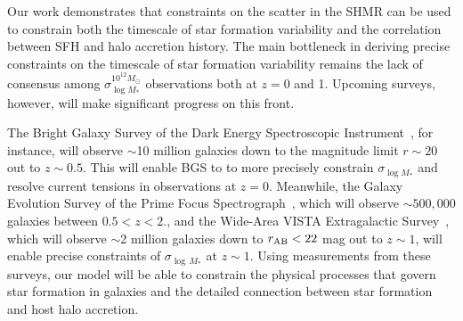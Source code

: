 \documentclass[12pt, letterpaper, preprint, tighten]{aastex62}
\newcommand{\siglogm}{\sigma_{\log M_*}}
\begin{document}
Our work demonstrates that constraints on the scatter in the SHMR can be
used to constrain both the timescale of star formation variability and
the correlation between SFH and halo accretion history. The main
bottleneck in deriving precise constraints on the timescale of star formation
variability remains the lack of consensus among $\siglogm^{10^{12}M_\odot}$
observations both at $z = 0$ and 1. Upcoming surveys, however, will make significant
progress on this front. 

The Bright Galaxy Survey of the Dark Energy Spectroscopic Instrument~\citep[DESI;][]{desicollaboration2016}, 
for instance, will observe $\sim$10 million galaxies down to the magnitude 
limit $r \sim 20$ out to $z\sim0.5$. This will enable BGS to to more precisely 
constrain $\sigma_{\log M_*}$ and resolve current tensions in observations at 
$z=0$. Meanwhile, the Galaxy Evolution Survey of the Prime Focus Spectrograph~\citep{takada2014,tamura2016}, 
which will observe $\sim500,000$ galaxies between $0.5 < z < 2.$, and the 
Wide-Area VISTA Extragalactic Survey~\citep[WAVES;][]{driver2016,driver2019}, which 
will observe $\sim$2 million galaxies down to $r_{\rm AB} < 22$ mag out to $z\sim 1$, 
will enable precise constraints of $\sigma_{\log\,M_*}$ at $z\sim1$. 
Using measurements from these surveys, our model will be able to constrain 
the physical processes that govern star formation in galaxies and the detailed
connection between star formation and host halo accretion.

\end{document}
